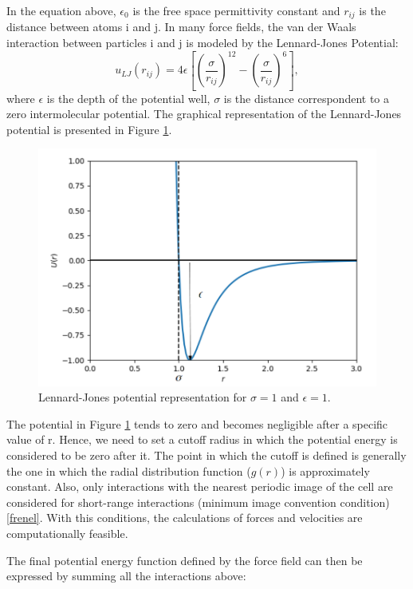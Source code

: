 In the equation above, $\epsilon _{0}$ is the free space permittivity constant and $r_{ij}$ is the distance between atoms i and j. In many force fields, the van der Waals interaction between particles i and j is modeled by the Lennard-Jones Potential:
\begin{equation}
u_{LJ}(r_{ij}) = 4 \epsilon
\left[ \left(\frac{\sigma}{r_{ij}} \right)^{12} - \left(\frac{\sigma}{r_{ij}} \right)^{6} \right],
\end{equation}
where  $\epsilon$ is the depth of the potential well, $\sigma$ is the distance correspondent to a zero intermolecular potential. The graphical representation of the Lennard-Jones potential is presented in Figure \ref{fig:lj}.
\begin{figure}[H]
	\centering
	\includegraphics[width=0.8\linewidth]{Figures/lj2}
	\caption{Lennard-Jones potential representation for $\sigma = 1$ and $\epsilon = 1$. }
	\label{fig:lj}
\end{figure}

The potential in Figure \ref{fig:lj} tends to zero and becomes negligible after a specific value of r. Hence, we need to set a cutoff radius in which the potential energy is considered to be zero after it. The point in which the cutoff is defined is generally the one in which the radial distribution function ($g(r)$) is approximately constant. Also, only interactions with the nearest periodic image of the cell are considered for short-range interactions (minimum image convention condition) \ref{frenel}. With this conditions, the calculations of forces and velocities are computationally feasible.

The final potential energy function defined by the force field can then be expressed by summing all the interactions above:

